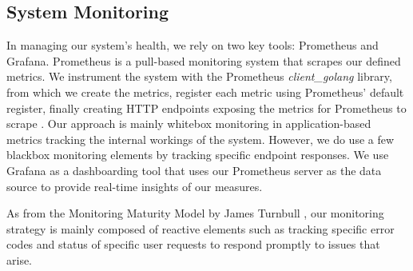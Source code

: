 

\subsection{System Monitoring}


In managing our system's health, we rely on two key tools: Prometheus and Grafana. Prometheus is a pull-based monitoring system that scrapes our defined metrics. We instrument the system with the Prometheus \textit{client\_golang} library, from which we create the metrics, register each metric using Prometheus' default register, finally creating HTTP endpoints exposing the metrics for Prometheus to scrape \cite{prometheusGolang}. Our approach is mainly whitebox monitoring in application-based metrics tracking the internal workings of the system. However, we do use a few blackbox monitoring elements by tracking specific endpoint responses. We use Grafana as a dashboarding tool that uses our Prometheus server as the data source to provide real-time insights of our measures.

As from the Monitoring Maturity Model by James Turnbull \cite{MonitoringMaturityModel}, our monitoring strategy is mainly composed of reactive elements such as tracking specific error codes and status of specific user requests to respond promptly to issues that arise.



